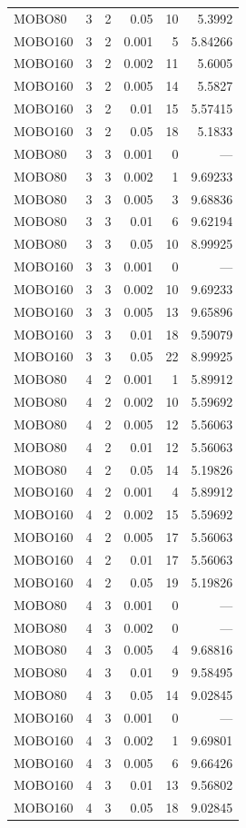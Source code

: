 \begin{tabular}{lrrrrr}
MOBO80 & 3 & 2 & 0.05 & 10 & 5.3992 \\
MOBO160 & 3 & 2 & 0.001 & 5 & 5.84266 \\
MOBO160 & 3 & 2 & 0.002 & 11 & 5.6005 \\
MOBO160 & 3 & 2 & 0.005 & 14 & 5.5827 \\
MOBO160 & 3 & 2 & 0.01 & 15 & 5.57415 \\
MOBO160 & 3 & 2 & 0.05 & 18 & 5.1833 \\
MOBO80 & 3 & 3 & 0.001 & 0 & — \\
MOBO80 & 3 & 3 & 0.002 & 1 & 9.69233 \\
MOBO80 & 3 & 3 & 0.005 & 3 & 9.68836 \\
MOBO80 & 3 & 3 & 0.01 & 6 & 9.62194 \\
MOBO80 & 3 & 3 & 0.05 & 10 & 8.99925 \\
MOBO160 & 3 & 3 & 0.001 & 0 & — \\
MOBO160 & 3 & 3 & 0.002 & 10 & 9.69233 \\
MOBO160 & 3 & 3 & 0.005 & 13 & 9.65896 \\
MOBO160 & 3 & 3 & 0.01 & 18 & 9.59079 \\
MOBO160 & 3 & 3 & 0.05 & 22 & 8.99925 \\
MOBO80 & 4 & 2 & 0.001 & 1 & 5.89912 \\
MOBO80 & 4 & 2 & 0.002 & 10 & 5.59692 \\
MOBO80 & 4 & 2 & 0.005 & 12 & 5.56063 \\
MOBO80 & 4 & 2 & 0.01 & 12 & 5.56063 \\
MOBO80 & 4 & 2 & 0.05 & 14 & 5.19826 \\
MOBO160 & 4 & 2 & 0.001 & 4 & 5.89912 \\
MOBO160 & 4 & 2 & 0.002 & 15 & 5.59692 \\
MOBO160 & 4 & 2 & 0.005 & 17 & 5.56063 \\
MOBO160 & 4 & 2 & 0.01 & 17 & 5.56063 \\
MOBO160 & 4 & 2 & 0.05 & 19 & 5.19826 \\
MOBO80 & 4 & 3 & 0.001 & 0 & — \\
MOBO80 & 4 & 3 & 0.002 & 0 & — \\
MOBO80 & 4 & 3 & 0.005 & 4 & 9.68816 \\
MOBO80 & 4 & 3 & 0.01 & 9 & 9.58495 \\
MOBO80 & 4 & 3 & 0.05 & 14 & 9.02845 \\
MOBO160 & 4 & 3 & 0.001 & 0 & — \\
MOBO160 & 4 & 3 & 0.002 & 1 & 9.69801 \\
MOBO160 & 4 & 3 & 0.005 & 6 & 9.66426 \\
MOBO160 & 4 & 3 & 0.01 & 13 & 9.56802 \\
MOBO160 & 4 & 3 & 0.05 & 18 & 9.02845 \\
\bottomrule
\end{tabular}
